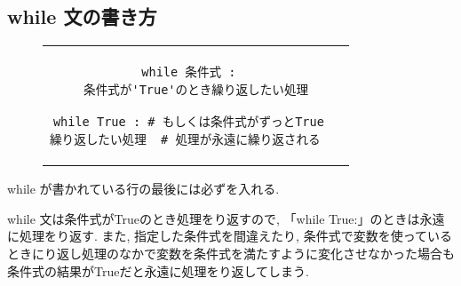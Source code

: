 \documentclass{jsarticle}
\begin{document}
\subsection{while 文の書き方}
\begin{figure}[h]
	\begin{tabular}{cc}
		\begin{minipage}[c]{.45\textwidth}
			\begin{lstlisting}[caption=while 文の基本構文]
while 条件式 :
  条件式が'True'のとき繰り返したい処理\end{lstlisting}
		\end{minipage} \hspace{3mm}
		\begin{minipage}[c]{.55\textwidth}
			\begin{lstlisting}[caption=while 文の注意点]
while True : # もしくは条件式がずっとTrue
繰り返したい処理  # 処理が永遠に繰り返される \end{lstlisting}
		\end{minipage}
	\end{tabular}
\end{figure}
while が書かれている行の最後には必ずを入れる.  \par
while 文は条件式がTrueのとき処理をり返すので, 「while True:」のときは永遠に処理をり返す.
また, 指定した条件式を間違えたり, 条件式で変数を使っているときにり返し処理のなかで変数を条件式を満たすように変化させなかった場合も条件式の結果がTrueだと永遠に処理をり返してしまう.
\newpage
\end{document}
